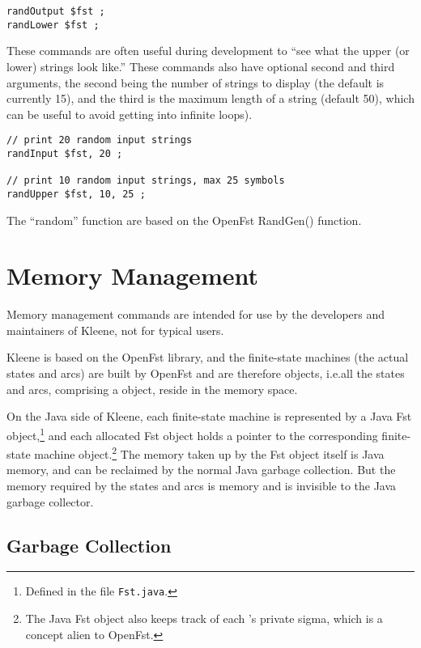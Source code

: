 \begin{Verbatim}
randOutput $fst ;
randLower $fst ;
\end{Verbatim}

\noindent
These commands are often useful during development to ``see what the upper (or lower)
strings look like.''  These commands also have optional second and third arguments, the second
being the number of strings to display (the default is currently 15), and the third is the
maximum length of a string (default 50), which can be useful to avoid getting into infinite loops).

\begin{Verbatim}
// print 20 random input strings
randInput $fst, 20 ;

// print 10 random input strings, max 25 symbols
randUpper $fst, 10, 25 ;
\end{Verbatim}

\noindent
The ``random'' function are based on the OpenFst RandGen() function.

\section{Memory Management}

Memory management commands are intended for use by the developers and
maintainers of Kleene, not for typical users.

Kleene is based on the OpenFst library, and the finite-state machines 
(the actual states and arcs) are built by OpenFst and are therefore
\CPP{} objects, i.e.\@ all the states and arcs, comprising a \CPP{}
\fsm{} object, reside in the \CPP{} memory space.

On the Java side of Kleene, each finite-state machine is represented by a
Java Fst object,\footnote{Defined in the file \texttt{Fst.java}.} and
each allocated Fst object holds a pointer to the corresponding \CPP{}
finite-state machine object.\footnote{The Java Fst object also keeps
track of each \fsm{}'s private sigma, which is a concept alien to
OpenFst.}  The memory taken up by the Fst object itself is Java memory,
and can be reclaimed by the normal Java garbage collection.  But the
memory required by the states and arcs is \CPP{} memory and is invisible
to the Java garbage collector.

\subsection{Garbage Collection}

